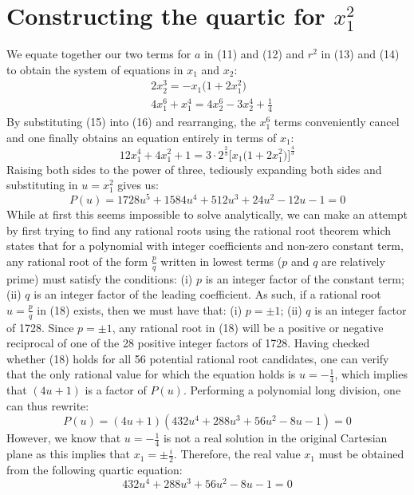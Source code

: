 \documentclass{article}
\begin{document}
\section{Constructing the quartic for $x_1^2$}
We equate together our two terms for $a$ in (11) and (12) and $r^2$ in (13) and (14) to obtain the system of equations in $x_1$ and $x_2$:
\begin{align*}
    \tag{15} &2x_2^3=-x_1\big(1+2x_1^2\big) \\
    \tag{16} & 4x_1^6+x_1^4=4x_2^6-3x_2^4+\frac{1}{4}
\end{align*}
By substituting (15) into (16) and rearranging, the $x_1^6$ terms conveniently cancel and one finally obtains an equation entirely in terms of $x_1$:
\begin{equation}
    \tag{17} 12x_1^4+4x_1^2+1=3\cdot 2^\frac{2}{3}\Big[x_1\big(1+2x_1^2\big)\Big]^\frac{4}{3}
\end{equation}
\noindent Raising both sides to the power of three, tediously expanding both sides and substituting in $u=x_1^2$ gives us:
\begin{equation}
    \tag{18} P(u)=1728u^5+1584u^4+512u^3+24u^2-12u-1=0
\end{equation}
While at first this seems impossible to solve analytically, we can make an attempt by first trying to find any rational roots using the rational root theorem which states that for a polynomial with integer coefficients and non-zero constant term, any rational root of the form $\frac{p}{q}$ written in lowest terms ($p$ and $q$ are relatively prime) must satisfy the conditions:
\newline\newline
\indent (i) \space $p$ is an integer factor of the constant term;
\newline
\indent (ii) $q$ is an integer factor of the leading coefficient. 
\newline\newline
As such, if a rational root $u=\frac{p}{q}$ in (18) exists, then we must have that:
\newline\newline
\indent (i) \space $p=\pm1$;
\newline
\indent (ii) $q$ is an integer factor of 1728. 
\newline\newline
Since $p=\pm1$, any rational root in (18) will be a positive or negative reciprocal of one of the 28 positive integer factors of 1728. Having checked whether (18) holds for all 56 potential rational root candidates, one can verify that the only rational value for which the equation holds is $u=-\frac{1}{4}$, which implies that $(4u+1)$ is a factor of $P(u)$. Performing a polynomial long division, one can thus rewrite:
\begin{equation*}
    \tag{19} P(u)=(4u+1)(432u^4+288u^3+56u^2-8u-1)=0
\end{equation*}
However, we know that $u=-\frac{1}{4}$ is not a real solution in the original Cartesian plane as this implies that $x_1=\pm\frac{i}{2}$. Therefore, the real value $x_1$ must be obtained from the following quartic equation:
\begin{equation}
    \tag{20} 432u^4+288u^3+56u^2-8u-1=0
\end{equation}
\end{document}
